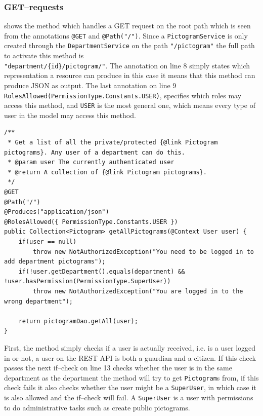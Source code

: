 \subsubsection*{GET--requests}
 shows the method which handles a GET request on the root path which is seen from the annotations \texttt{@GET} and \texttt{@Path("/")}.
Since a \texttt{PictogramService} is only created through the \texttt{DepartmentService} on the path \texttt{"/pictogram"} the full path to activate this method is \\ \texttt{"department/\{id\}/pictogram/"}.
The annotation on line 8 simply states which representation a resource can produce in this case it means that this method can produce JSON as output.
The last annotation on line 9 \texttt{RolesAllowed({PermissionType.Constants.USER})}, specifies which roles may access this method, and \texttt{USER} is the most general one, which means every type of user in the model may access this method.

\begin{lstlisting}[float, floatplacement=h, caption={A GET request to get all pictograms for a department.},label={lst:getallPictograms}]
/**
 * Get a list of all the private/protected {@link Pictogram pictograms}. Any user of a department can do this.
 * @param user The currently authenticated user
 * @return A collection of {@link Pictogram pictograms}.
 */
@GET
@Path("/")
@Produces("application/json")
@RolesAllowed({ PermissionType.Constants.USER })
public Collection<Pictogram> getAllPictograms(@Context User user) {
    if(user == null)
        throw new NotAuthorizedException("You need to be logged in to add department pictograms");
    if(!user.getDepartment().equals(department) && !user.hasPermission(PermissionType.SuperUser))
        throw new NotAuthorizedException("You are logged in to the wrong department");

    return pictogramDao.getAll(user);
}
\end{lstlisting}

First, the method simply checks if a user is actually received, i.e. is a user logged in or not, a user on the REST API is both a guardian and a citizen.
If this check passes the next if--check on line 13 checks whether the user is in the same department as the department the method will try to get \texttt{Pictogram}s from, if this check fails it also checks whether the user might be a \texttt{SuperUser}, in which case it is also allowed and the if--check will fail.
A \texttt{SuperUser} is a user with permissions to do administrative tasks such as create public pictograms.

